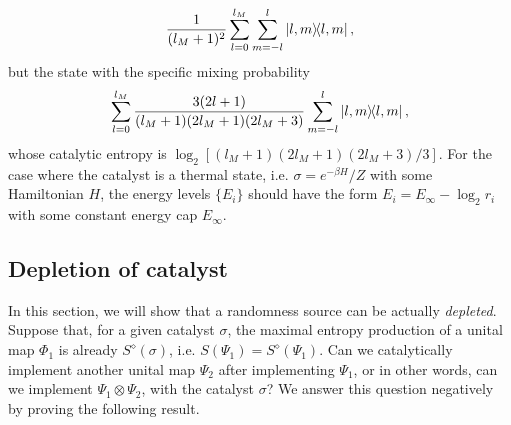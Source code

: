 \documentclass[aps, reprint, amsmath,amssymb, prx, superscriptaddress]{revtex4-2}
\begin{document}
\begin{equation}
    \frac{1}{(l_M+1)^2}\sum_{l=0}^{l_M}\sum_{m=-l}^l \dyad{l,m},
\end{equation}
but the state with the specific mixing probability
\begin{equation}
    \sum_{l=0}^{l_M}\frac{3(2l+1)}{(l_M+1)(2l_M+1)(2l_M+3)}\sum_{m=-l}^l \dyad{l,m},
\end{equation}
whose catalytic entropy is $\log_2[(l_M+1)(2l_M+1)(2l_M+3)/3]$.
For the case where the catalyst is a thermal state, i.e. $\sigma=e^{-\beta H}/Z$ with some Hamiltonian $H$, the energy levels $\{E_i\}$ should have the form $E_i = E_\infty -\log_2  r_i $ with some constant energy cap $E_\infty$.


\subsection{Depletion of catalyst} \label{subsec:depcat}

In this section, we will show that a randomness source can be actually \textit{depleted}. Suppose that, for a given catalyst $\sigma$, the maximal entropy production of a unital map $\Phi_1$ is already $S^\diamond(\sigma)$, i.e. $S(\Psi_1)=S^\diamond(\Psi_1)$. Can we catalytically implement another unital map $\Psi_2$ after implementing $\Psi_1$, or in other words, can we implement $\Psi_1\otimes\Psi_2$, with the catalyst $\sigma$? We answer this question negatively by proving the following result.
\end{document}
